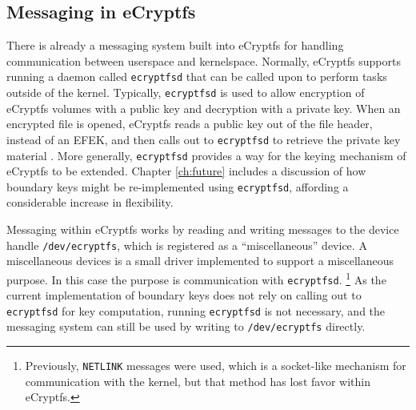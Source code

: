 \subsection{Messaging in eCryptfs}
 
There is already a messaging system built into eCryptfs for handling communication between userspace and kernelspace. Normally,
eCryptfs supports running a daemon called \texttt{ecryptfsd} that can be called upon to perform tasks outside of the kernel.
Typically, \texttt{ecryptfsd} is used to allow encryption of eCryptfs volumes with a public key and decryption with a private key.
When an encrypted file is opened, eCryptfs reads a public key out of the file header, instead of an EFEK, and then calls out to
\texttt{ecryptfsd} to retrieve the private key material \cite{ecryptfspki}. More generally, \texttt{ecryptfsd} provides a way 
for the keying mechanism of eCryptfs to be extended.  Chapter \ref{ch:future} includes a discussion of how boundary keys might be
re-implemented using \texttt{ecryptfsd}, affording a considerable increase in flexibility.

Messaging within eCryptfs works by reading and writing messages to the device handle \texttt{/dev/ecryptfs}, which is registered as a
``miscellaneous'' device. A miscellaneous devices is a small driver implemented to support a miscellaneous purpose. In this case the
purpose is communication with \texttt{ecryptfsd}. \footnote{Previously, \texttt{NETLINK} messages were used, which is a socket-like
mechanism for communication with the kernel, but that method has lost favor within eCryptfs.} As the current implementation of
boundary keys does not rely on calling out to \texttt{ecryptfsd} for key computation, running \texttt{ecryptfsd} is not necessary,
and the messaging system can still be used by writing to \texttt{/dev/ecryptfs} directly. 

